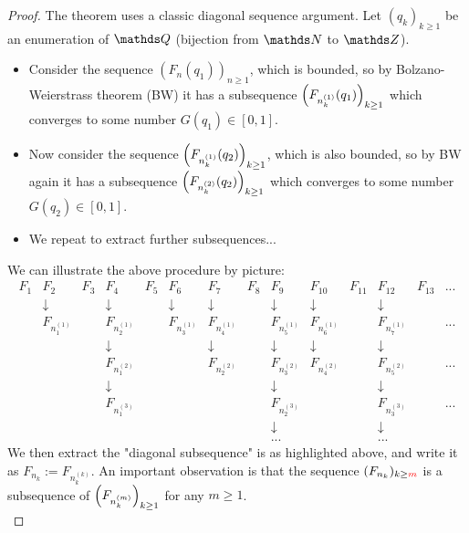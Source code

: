\begin{proof}
The theorem uses a classic diagonal sequence argument. Let $(q_k)_{k\geq 1}$ be an enumeration of $\Q$ (bijection from $\N$ to $\Z$). 
\begin{itemize}
\item Consider the sequence $(F_n(q_1))_{n\geq 1}$, which is bounded, so by Bolzano-Weierstrass theorem (BW) it has a subsequence $\left( F_{n_k^{(1)}}(q_1) \right)_{k \geq 1}$ which converges to some number $G(q_1) \in [0,1]$. 
\item Now consider the sequence $\left( F_{n_k^{(1)}}(q_2) \right)_{k\geq 1}$, which is also bounded, so by BW again it has a subsequence $\left( F_{n_k^{(2)}}(q_2) \right)_{k \geq 1}$ which converges to some number $G(q_2) \in [0,1]$.
\item We repeat to extract further subsequences...
\end{itemize}
We can illustrate the above procedure by picture:
\begin{equation*}
\begin{array}{cccccccccccccc}
F_1 & \boxed{F_2} & F_3 & F_4 & F_5 & F_6 & \boxed{F_7} & F_8 & F_9 & F_{10} & F_{11} & \boxed{F_{12}} & F_{13} & ... \\
 & \downarrow & & \downarrow &  & \downarrow & \downarrow & & \downarrow & \downarrow & & \downarrow & & \\
 & \boxed{F_{n^{(1)}_1}} & & F_{n^{(1)}_2} & & F_{n^{(1)}_3} & \boxed{F_{n^{(1)}_4}} & & F_{n^{(1)}_5} & F_{n^{(1)}_6} & & \boxed{F_{n^{(1)}_7}} & & ... \\
 & & & \downarrow & & & \downarrow & & \downarrow & \downarrow & & \downarrow & & \\
 & & & F_{n^{(2)}_1} & & & \boxed{F_{n^{(2)}_2}} & & F_{n^{(2)}_3} & F_{n^{(2)}_4} & & \boxed{F_{n^{(2)}_5}} & & ... \\
 & & & \downarrow & & & & & \downarrow & & & \downarrow & & \\
 & & & F_{n^{(3)}_1} & & & & & F_{n^{(3)}_2} & & & \boxed{F_{n^{(3)}_3}} & & ... \\
 & & & & & & & & \downarrow & & & \downarrow & & \\
 & & & & & & & & ... & & & ... & & 
\end{array}
\end{equation*}
We then extract the "diagonal subsequence" is as highlighted above, and write it as $F_{n_k} := F_{n_k^{(k)}}$. An important observation is that the sequence $(F_{n_k})_{k \geq \textcolor{red}{m}}$ is a subsequence of $\left( F_{n^{(m)}_k} \right)_{k\geq 1}$ for any $m \geq 1$. \\


\end{proof}
